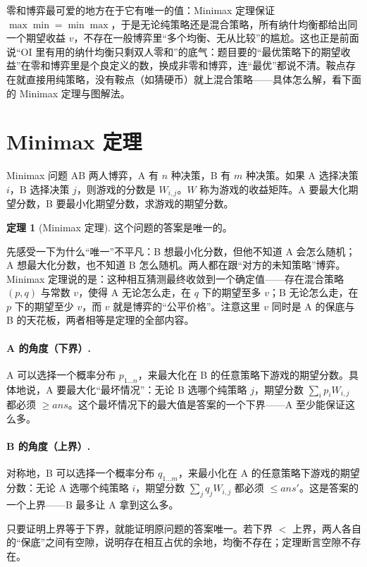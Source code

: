 \documentclass[UTF8,a4paper,11pt,oneside,openany,fontset=fandol]{ctexbook}
\theoremstyle{definition}
\newtheorem{theorem}[definition]{定理}
\begin{document}
零和博弈最可爱的地方在于它有唯一的值：Minimax 定理保证 $\max\min=\min\max$，于是无论纯策略还是混合策略，所有纳什均衡都给出同一个期望收益 $v$，不存在一般博弈里“多个均衡、无从比较”的尴尬。这也正是前面说“OI 里有用的纳什均衡只剩双人零和”的底气：题目要的“最优策略下的期望收益”在零和博弈里是个良定义的数，换成非零和博弈，连“最优”都说不清。鞍点存在就直接用纯策略，没有鞍点（如猜硬币）就上混合策略——具体怎么解，看下面的 Minimax 定理与图解法。

\section{Minimax 定理}
\begin{problem}{Minimax 问题}
AB 两人博弈，A 有 $n$ 种决策，B 有 $m$ 种决策。如果 A 选择决策 $i$，B 选择决策 $j$，则游戏的分数是 $W_{i,j}$。$W$ 称为游戏的收益矩阵。A 要最大化期望分数，B 要最小化期望分数，求游戏的期望分数。
\end{problem}

\begin{theorem}[Minimax 定理]\label{thm:minimax}
这个问题的答案是唯一的。
\end{theorem}

先感受一下为什么“唯一”不平凡：B 想最小化分数，但他不知道 A 会怎么随机；A 想最大化分数，也不知道 B 怎么随机。两人都在跟“对方的未知策略”博弈。Minimax 定理说的是：这种相互猜测最终收敛到一个确定值——存在混合策略 $(p,q)$ 与常数 $v$，使得 A 无论怎么走，在 $q$ 下的期望至多 $v$；B 无论怎么走，在 $p$ 下的期望至少 $v$，而 $v$ 就是博弈的“公平价格”。注意这里 $v$ 同时是 A 的保底与 B 的天花板，两者相等是定理的全部内容。

\paragraph{A 的角度（下界）.} A 可以选择一个概率分布 $p_{1\ldots n}$，来最大化在 B 的任意策略下游戏的期望分数。具体地说，A 要最大化“最坏情况”：无论 B 选哪个纯策略 $j$，期望分数 $\sum_i p_iW_{i,j}$ 都必须 $\ge ans$。这个最坏情况下的最大值是答案的一个下界——A 至少能保证这么多。

\paragraph{B 的角度（上界）.} 对称地，B 可以选择一个概率分布 $q_{1\ldots m}$，来最小化在 A 的任意策略下游戏的期望分数：无论 A 选哪个纯策略 $i$，期望分数 $\sum_j q_jW_{i,j}$ 都必须 $\le ans'$。这是答案的一个上界——B 最多让 A 拿到这么多。

只要证明上界等于下界，就能证明原问题的答案唯一。若下界 $<$ 上界，两人各自的“保底”之间有空隙，说明存在相互占优的余地，均衡不存在；定理断言空隙不存在。
\end{document}
